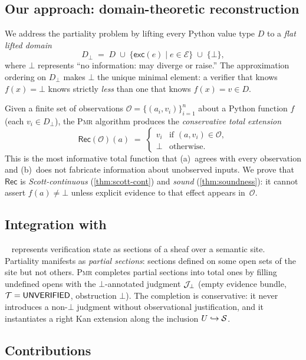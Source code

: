 \documentclass[11pt]{article}
\newcommand{\LiftD}[1]{#1_{\bot}}           %
\newcommand{\PExc}[1]{\mathsf{exc}(#1)}    %
\newcommand{\PMR}{\textsc{Pmr}}            %
\newcommand{\ObsSet}{\mathcal{O}}          %
\newcommand{\RecAlg}{\mathsf{Rec}}         %
\newcommand{\ExcH}{\mathcal{E}}            %
\begin{document}
\subsection{Our approach: domain-theoretic reconstruction}

We address the partiality problem by lifting every Python value type $D$
to a \emph{flat lifted domain}
\[
  \LiftD{D} \;=\; D \;\cup\; \{\PExc{e} \mid e \in \ExcH\} \;\cup\; \{\bot\},
\]
where $\bot$ represents ``no information: may diverge or raise.''  The
approximation ordering on $\LiftD{D}$ makes $\bot$ the unique minimal
element: a verifier that knows $f(x) = \bot$ knows strictly \emph{less}
than one that knows $f(x) = v \in D$.

Given a finite set of observations $\ObsSet = \{(a_i, v_i)\}_{i=1}^{n}$
about a Python function $f$ (each $v_i \in \LiftD{D}$), the \PMR{}
algorithm produces the \emph{conservative total extension}
\[
  \RecAlg(\ObsSet)(a) \;=\;
  \begin{cases}
    v_i & \text{if } (a, v_i) \in \ObsSet, \\
    \bot & \text{otherwise.}
  \end{cases}
\]
This is the most informative total function that (a)~agrees with every
observation and (b)~does not fabricate information about unobserved
inputs.  We prove that $\RecAlg$ is \emph{Scott-continuous}
(\cref{thm:scott-cont}) and \emph{sound} (\cref{thm:soundness}): it
cannot assert $f(a) \neq \bot$ unless explicit evidence to that effect
appears in~$\ObsSet$.

\subsection{Integration with \JuGeo{}}

\JuGeo{}~\cite{jugeo01} represents verification state as sections of a
sheaf over a semantic site.  Partiality manifests as \emph{partial
sections}: sections defined on some open sets of the site but not
others.  \PMR{} completes partial sections into total ones by filling
undefined opens with the $\bot$-annotated judgment $\mathcal{J}_\bot$ (empty
evidence bundle, $\mathcal{T} = \mathsf{UNVERIFIED}$, obstruction $\bot$).  The
completion is conservative: it never introduces a non-$\bot$ judgment
without observational justification, and it instantiates a right Kan
extension along the inclusion $U \hookrightarrow \mathcal{S}$.

\subsection{Contributions}
\end{document}
